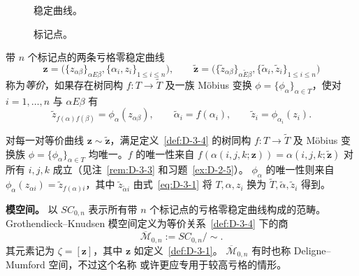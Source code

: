 \begin{figure}[htbp]
  \centering
  \caption{稳定曲线。}\label{fig:D-3-3}
\end{figure}

\begin{figure}[htbp]
  \centering
  \caption{标记点。}\label{fig:D-3-4}
\end{figure}

\begin{definition}[等价]\label{def:D-3-4}
带 $n$ 个标记点的两条亏格零稳定曲线
\[
  \mathbf z=\bigl(\{z_{\alpha\beta}\}_{\alpha E\beta},
  \{\alpha_i,z_i\}_{1\le i\le n}\bigr),\qquad
  \widetilde{\mathbf z}=
  \bigl(\{\widetilde z_{\alpha\beta}\}_{\alpha\widetilde E\beta},
  \{\widetilde\alpha_i,\widetilde z_i\}_{1\le i\le n}\bigr)
\]
称为\emph{等价}，如果存在树同构 $f:T\to\widetilde T$ 及一族 Möbius 变换
$\phi=\{\phi_\alpha\}_{\alpha\in T}$，使对 $i=1,\ldots,n$ 与
$\alpha E\beta$ 有
\[
  \widetilde z_{f(\alpha)f(\beta)}=\phi_\alpha(z_{\alpha\beta}),
  \qquad\widetilde\alpha_i=f(\alpha_i),\qquad
  \widetilde z_i=\phi_{\alpha_i}(z_i).
\]
\end{definition}

对每一对等价曲线 $\mathbf z\sim\widetilde{\mathbf z}$，满足定义~\ref{def:D-3-4}
的树同构 $f:T\to\widetilde T$ 及 Möbius 变换族
$\phi=\{\phi_\alpha\}_{\alpha\in T}$ 均唯一。$f$ 的唯一性来自
$f(\alpha(i,j,k;\mathbf z))=\alpha(i,j,k;\widetilde{\mathbf z})$
对所有 $i,j,k$ 成立（见注~\ref{rem:D-3-3} 和习题~\ref{ex:D-2-5}）。
$\phi_\alpha$ 的唯一性则来自
$\phi_\alpha(z_{\alpha i})=\widetilde z_{f(\alpha)i}$，其中
$\widetilde z_{\widetilde\alpha i}$ 由式~\eqref{eq:D-3-1} 将
$T,\alpha,z_i$ 换为 $\widetilde T,\widetilde\alpha,\widetilde z_i$ 得到。

\noindent\textbf{模空间。}
以 $SC_{0,n}$ 表示所有带 $n$ 个标记点的亏格零稳定曲线构成的范畴。
Grothendieck--Knudsen 模空间定义为等价关系~\ref{def:D-3-4} 下的商
\[
  \overline{\mathcal M}_{0,n}:=SC_{0,n}/\sim.
\]
其元素记为 $\zeta=[\mathbf z]$，其中 $\mathbf z$ 如定义~\ref{def:D-3-1}。
$\overline{\mathcal M}_{0,n}$ 有时也称 Deligne--Mumford 空间，不过这个名称
或许更应专用于较高亏格的情形。

